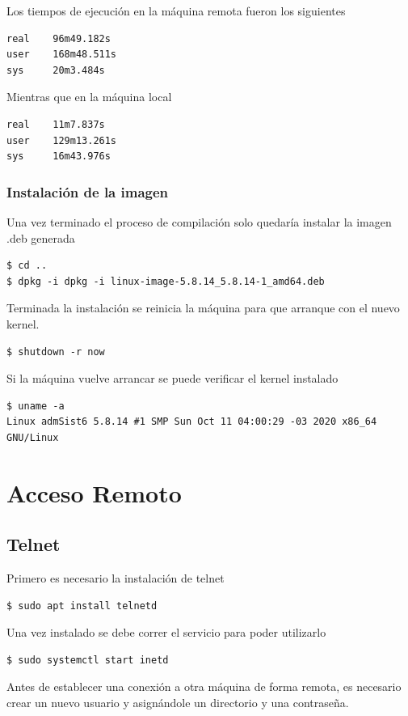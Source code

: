 \documentclass[12pt]{article}
\begin{document}
Los tiempos de ejecución en la máquina remota fueron los siguientes
\begin{lstlisting}[frame=single]
real    96m49.182s
user    168m48.511s
sys     20m3.484s
\end{lstlisting}

Mientras que en la máquina local
\begin{lstlisting}[frame=single]
real    11m7.837s
user    129m13.261s
sys     16m43.976s
\end{lstlisting}

\subsubsection{Instalación de la imagen}

Una vez terminado el proceso de compilación solo quedaría instalar la imagen .deb generada
\begin{lstlisting}[frame=single]
$ cd ..
$ dpkg -i dpkg -i linux-image-5.8.14_5.8.14-1_amd64.deb
\end{lstlisting}

Terminada la instalación se reinicia la máquina para que arranque con el nuevo kernel. 
\begin{lstlisting}[frame=single]
$ shutdown -r now
\end{lstlisting}
Si la máquina vuelve arrancar se puede verificar el kernel instalado
\begin{lstlisting}[frame=single]
$ uname -a
Linux admSist6 5.8.14 #1 SMP Sun Oct 11 04:00:29 -03 2020 x86_64 GNU/Linux
\end{lstlisting}
\newpage
\section{Acceso Remoto}
\subsection{Telnet}

Primero es necesario la instalación de telnet
\begin{lstlisting}[frame=single]
$ sudo apt install telnetd
\end{lstlisting}

Una vez instalado se debe correr el servicio para poder utilizarlo
\begin{lstlisting}[frame=single]
$ sudo systemctl start inetd
\end{lstlisting}

Antes de establecer una conexión a otra máquina de forma remota, es necesario crear un nuevo usuario y asignándole un directorio y una contraseña.
\end{document}
